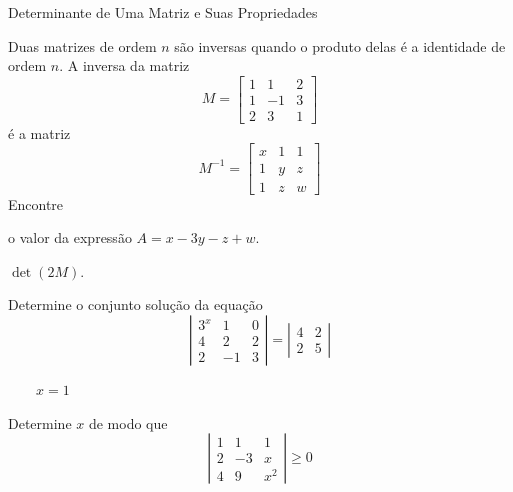 \begin{exercicios}{Determinante de Uma Matriz e Suas Propriedades}
    \begin{exercicio}
        Duas matrizes de ordem $n$ são inversas quando o produto delas é a identidade de ordem $n$. A inversa da matriz
        \[M = \left[\begin{array}{rrr}
        	1 &  1 & 2 \\
        	1 & -1 & 3 \\
        	2 &  3 & 1
        \end{array} \right]\]
        é a matriz
        \[
        M^{-1} = \left[\begin{array}{ccc}
        	x & 1 & 1 \\
        	1 & y & z \\
        	1 & z & w
        \end{array} \right]\]
        Encontre
        \begin{alphalist}
            \item o valor da expressão $A = x - 3y - z + w$.
            \item $\det(2M)$.
        \end{alphalist}
    \end{exercicio}
    
    \begin{exercicio}
        Determine o conjunto solução da equação
        \[\left|\begin{array}{lrc}
        	3^x &  1 & 0 \\
        	4   &  2 & 2 \\
        	2   & -1 & 3
        \end{array} \right| = \left|\begin{array}{cc}
            4 & 2 \\ 
            2 & 5
        \end{array} \right|\]
        \begin{answers} \( \qquad x = 1\)
        \end{answers}
    \end{exercicio}
    
    \begin{exercicio}
        Determine $x$ de modo que
        \[\left|\begin{array}{crl}
        	1 &  1 & 1   \\
        	2 & -3 & x   \\
        	4 &  9 & x^2
        \end{array} \right| \geq 0 \]
    \end{exercicio}
    

\end{exercicios}
